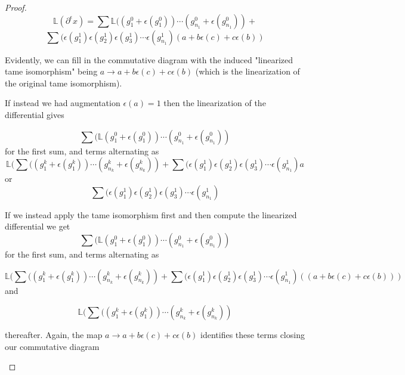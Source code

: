 \documentclass[11pt,oneside]{amsart}
\begin{document}
\begin{proof}
\[\mathbb{L}(\partial^{\epsilon} x)  = \sum \mathbb{L}((g_1^{0} + \epsilon(g_1^{0})) \cdots (g_{n_1}^{0} + \epsilon(g_{n_1}^{0})) +    \]
\[\sum (\epsilon(g_1^{1})\epsilon(g_2^{1})\epsilon(g_3^{1}) \cdots \epsilon(g_{n_1}^{1})(a + b\epsilon(c) + c \epsilon(b)) \]

Evidently, we can fill in the commutative diagram with the induced "linearized tame isomorphism" being $a \rightarrow a + b\epsilon(c) + c \epsilon(b)$ (which is the linearization of the original tame isomorphism). 



If instead we had augmentation $\epsilon(a) = 1$ then the linearization of the differential gives 

\[ \sum (\mathbb{L}(g_1^{0} + \epsilon(g_1^{0})) \cdots (g_{n_1}^{0} + \epsilon(g_{n_1}^{0}))\]
for the first sum, and terms alternating as 
\[ \mathbb{L}(\sum ((g_1^{k} + \epsilon(g_1^{k})) \cdots (g_{n_k}^{k} + \epsilon(g_{n_k}^{k})) + \sum (\epsilon(g_1^{1})\epsilon(g_2^{1})\epsilon(g_3^{1}) \cdots \epsilon(g_{n_1}^{1})a\]
or
\[ \sum (\epsilon(g_1^{1})\epsilon(g_2^{1})\epsilon(g_3^{1}) \cdots \epsilon(g_{n_1}^{1})\]



If we instead apply the tame isomorphism first and then compute the linearized differential we get
\[ \sum (\mathbb{L}(g_1^{0} + \epsilon(g_1^{0})) \cdots (g_{n_1}^{0} + \epsilon(g_{n_1}^{0}))\]
for the first sum, and terms alternating as 



\[ \mathbb{L}(\sum ((g_1^{k} + \epsilon(g_1^{k})) \cdots (g_{n_k}^{k} + \epsilon(g_{n_k}^{k})) + \sum (\epsilon(g_1^{1})\epsilon(g_2^{1})\epsilon(g_3^{1}) \cdots \epsilon(g_{n_1}^{1})(  (a  + b\epsilon(c) + c \epsilon(b)))\]
and

\[ \mathbb{L}(\sum ((g_1^{k} + \epsilon(g_1^{k})) \cdots (g_{n_k}^{k} + \epsilon(g_{n_k}^{k})) \]

thereafter. Again, the map $a \rightarrow a + b\epsilon(c) + c \epsilon(b)$ identifies these terms closing our commutative diagram






\begin{figure}[htbp]



\end{figure}
\end{proof}
\end{document}
